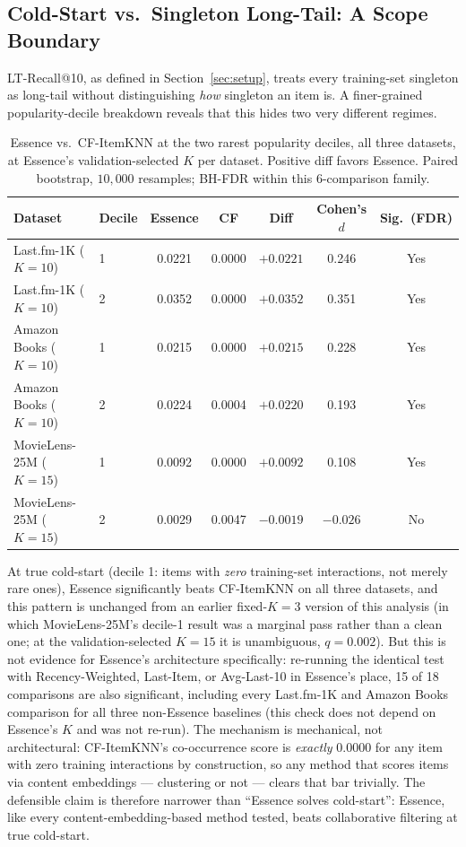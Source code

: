 \documentclass[11pt,a4paper]{article}
\begin{document}
\subsection{Cold-Start vs.\ Singleton Long-Tail: A Scope Boundary}
\label{sec:coldstart}

LT-Recall@10, as defined in Section~\ref{sec:setup}, treats every
training-set singleton as long-tail without distinguishing \emph{how}
singleton an item is. A finer-grained popularity-decile breakdown reveals
that this hides two very different regimes.

\begin{table}[H]
\centering
\caption{Essence vs.\ CF-ItemKNN at the two rarest popularity deciles, all
         three datasets, at Essence's validation-selected $K$ per dataset.
         Positive diff favors Essence. Paired bootstrap, $10{,}000$
         resamples; BH-FDR within this 6-comparison family.}
\label{tab:coldstart}
\begin{tabular}{llccccc}
\toprule
\textbf{Dataset} & \textbf{Decile} & \textbf{Essence} & \textbf{CF} & \textbf{Diff} & \textbf{Cohen's $d$} & \textbf{Sig.\ (FDR)} \\
\midrule
Last.fm-1K ($K=10$)    & 1 & 0.0221 & 0.0000 & $+0.0221$ & 0.246 & Yes \\
Last.fm-1K ($K=10$)    & 2 & 0.0352 & 0.0000 & $+0.0352$ & 0.351 & Yes \\
Amazon Books ($K=10$)  & 1 & 0.0215 & 0.0000 & $+0.0215$ & 0.228 & Yes \\
Amazon Books ($K=10$)  & 2 & 0.0224 & 0.0004 & $+0.0220$ & 0.193 & Yes \\
MovieLens-25M ($K=15$) & 1 & 0.0092 & 0.0000 & $+0.0092$ & 0.108 & Yes \\
MovieLens-25M ($K=15$) & 2 & 0.0029 & 0.0047 & $-0.0019$ & $-0.026$ & No \\
\bottomrule
\end{tabular}
\end{table}

At true cold-start (decile 1: items with \emph{zero} training-set
interactions, not merely rare ones), Essence significantly beats
CF-ItemKNN on all three datasets, and this pattern is unchanged from an
earlier fixed-$K=3$ version of this analysis (in which MovieLens-25M's
decile-1 result was a marginal pass rather than a clean one; at the
validation-selected $K=15$ it is unambiguous, $q=0.002$). But this is not
evidence for Essence's architecture specifically: re-running the identical
test with Recency-Weighted, Last-Item, or Avg-Last-10 in Essence's place,
15 of 18 comparisons are also significant, including every Last.fm-1K and
Amazon Books comparison for all three non-Essence baselines (this check
does not depend on Essence's $K$ and was not re-run). The mechanism is
mechanical, not architectural: CF-ItemKNN's co-occurrence score is
\emph{exactly} $0.0000$ for any item with zero training interactions by
construction, so any method that scores items via content embeddings ---
clustering or not --- clears that bar trivially. The defensible claim is
therefore narrower than ``Essence solves cold-start'': Essence, like every
content-embedding-based method tested, beats collaborative filtering at
true cold-start.
\end{document}
